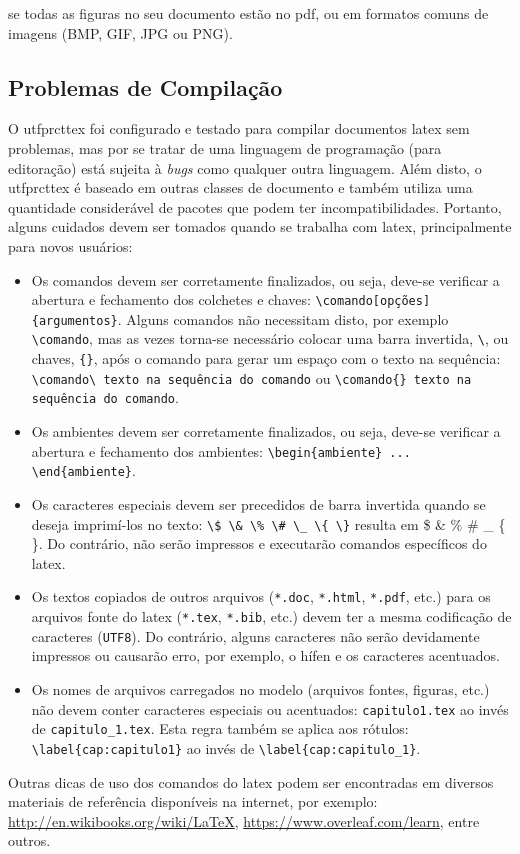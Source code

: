 \noindent se todas as figuras no seu documento estão no \gls{pdf}, ou em formatos comuns de imagens (BMP, GIF, JPG ou PNG).

\subsection{Problemas de Compilação}\label{sec:problemas}

O \gls{utfprcttex} foi configurado e testado para compilar documentos \gls{latex} sem problemas, mas por se tratar de uma linguagem de programação (para editoração) está sujeita à \textit{bugs} como qualquer outra linguagem. Além disto, o \gls{utfprcttex} é baseado em outras classes de documento e também utiliza uma quantidade considerável de pacotes que podem ter incompatibilidades. Portanto, alguns cuidados devem ser tomados quando se trabalha com \gls{latex}, principalmente para novos usuários:

\begin{itemize}%
\item Os comandos devem ser corretamente finalizados, ou seja, deve-se verificar a abertura e fechamento dos colchetes e chaves: \verb|\comando[opções]{argumentos}|. Alguns comandos não necessitam disto, por exemplo \verb|\comando|, mas as vezes torna-se necessário colocar uma barra invertida, \verb|\|, ou chaves, \verb|{}|, após o comando para gerar um espaço com o texto na sequência: \verb|\comando\ texto na sequência do comando| ou \verb|\comando{} texto na sequência do comando|.
\item Os ambientes devem ser corretamente finalizados, ou seja, deve-se verificar a abertura e fechamento dos ambientes: \verb|\begin{ambiente} ... \end{ambiente}|.
\item Os caracteres especiais devem ser precedidos de barra invertida quando se deseja imprimí-los no texto: \verb|\$ \& \% \# \_ \{ \}| resulta em \$ \& \% \# \_ \{ \}. Do contrário, não serão impressos e executarão comandos específicos do \gls{latex}.
\item Os textos copiados de outros arquivos (\texttt{*.doc}, \texttt{*.html}, \texttt{*.pdf}, etc.) para os arquivos fonte do \gls{latex} (\texttt{*.tex}, \texttt{*.bib}, etc.) devem ter a mesma codificação de caracteres (\texttt{UTF8}). Do contrário, alguns caracteres não serão devidamente impressos ou causarão erro, por exemplo, o hífen e os caracteres acentuados.
\item Os nomes de arquivos carregados no modelo (arquivos fontes, figuras, etc.) não devem conter caracteres especiais ou acentuados: \verb|capitulo1.tex| ao invés de \verb|capitulo_1.tex|. Esta regra também se aplica aos rótulos: \verb|\label{cap:capitulo1}| ao invés de \verb|\label{cap:capitulo_1}|.
\end{itemize}

Outras dicas de uso dos comandos do \gls{latex} podem ser encontradas em diversos materiais de referência disponíveis na internet, por exemplo: \url{http://en.wikibooks.org/wiki/LaTeX}, \url{https://www.overleaf.com/learn}, entre outros.
